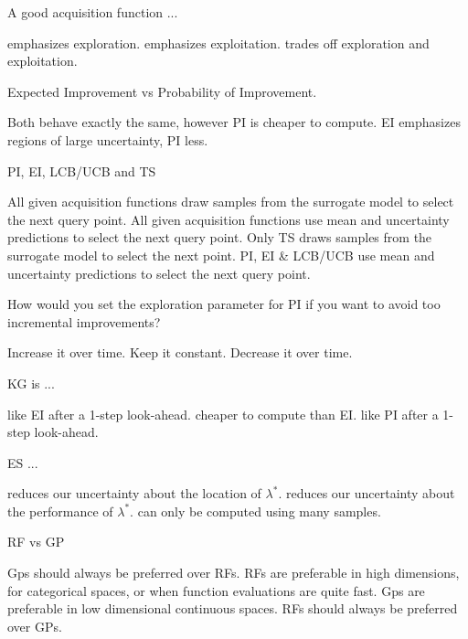 \documentclass{exam}
\begin{document}
\begin{questions}
		\question A good acquisition function ...
		\begin{choices}
			\choice emphasizes exploration.
			\choice emphasizes exploitation.
			\choice trades off exploration and exploitation. %
		\end{choices}
		
		\question Expected Improvement vs Probability of Improvement.
		\begin{choices}
			\choice Both behave exactly the same, however PI is cheaper to compute.
			\choice EI emphasizes regions of large uncertainty, PI less. %
		\end{choices}
		
		\question PI, EI, LCB/UCB and TS
		\begin{choices}
			\choice All given acquisition functions draw samples from the surrogate model to select the next query point.
			\choice All given acquisition functions use mean and uncertainty predictions to select the next query point.
			\choice Only TS draws samples from the surrogate model to select the next point. %
			\choice PI, EI \& LCB/UCB use mean and uncertainty predictions to select the next query point. %
		\end{choices}
		
		\question How would you set the exploration parameter for PI if you want to avoid too incremental improvements?
		\begin{choices}
			\choice Increase it over time. %
			\choice Keep it constant.
			\choice Decrease it over time.
		\end{choices}
		
		\question KG is ...
		\begin{choices}
			\choice like EI after a 1-step look-ahead. %
			\choice cheaper to compute than EI.
			\choice like PI after a 1-step look-ahead.
		\end{choices}
		
		\question ES ...
		\begin{choices}
			\choice reduces our uncertainty about the location of $\lambda^*$. %
			\choice reduces our uncertainty about the performance of $\lambda^*$.
			\choice can only be computed using many samples.
		\end{choices}
		
		\question RF vs GP
		\begin{choices}
			\choice Gps should always be preferred over RFs.
			\choice RFs are preferable in high dimensions, for categorical spaces, or when function evaluations are quite fast. %
			\choice Gps are preferable in low dimensional continuous spaces. %
			\choice RFs should always be preferred over GPs.
		\end{choices}
		

\end{questions}
\end{document}

